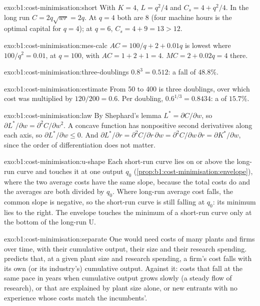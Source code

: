 \begin{solution}{exo:b1:cost-minimisation:short}
With $K = 4$, $L = q^2/4$ and $C_s = 4 + q^2/4$. In the long run $C = 2q\sqrt{wr} = 2q$.
At $q = 4$ both are 8 (four machine hours is the optimal capital for
$q = 4$); at $q = 6$, $C_s = 4 + 9 = 13 > 12$.
\end{solution}

\begin{solution}{exo:b1:cost-minimisation:mes-calc}
$AC = 100/q + 2 + 0.01q$ is lowest where $100/q^2 = 0.01$, at $q = 100$, with
$AC = 1 + 2 + 1 = 4$. $MC = 2 + 0.02q = 4$ there.
\end{solution}

\begin{solution}{exo:b1:cost-minimisation:three-doublings}
$0.8^3 = 0.512$: a fall of $48.8\%$.
\end{solution}

\begin{solution}{exo:b1:cost-minimisation:estimate}
From 50 to 400 is three doublings, over which cost was multiplied by
$120/200 = 0.6$. Per doubling, $0.6^{1/3} = 0.8434$: a  of $15.7\%$.
\end{solution}

\begin{solution}{exo:b1:cost-minimisation:law}
By Shephard's lemma $L^* = \partial C/\partial w$, so
$\partial L^*/\partial w = \partial^2C/\partial w^2$. A concave function has nonpositive second
derivatives along each axis, so $\partial L^*/\partial w \le 0$. And
$\partial L^*/\partial r = \partial^2C/\partial r\,\partial w = \partial^2C/\partial w\,\partial r = \partial K^*/\partial w$,
since the order of differentiation does not matter.
\end{solution}

\begin{solution}{exo:b1:cost-minimisation:u-shape}
Each short-run curve lies on or above the long-run curve and touches it at
one output $q_0$ (\cref{prop:b1:cost-minimisation:envelope}), where the two
average costs have the same slope, because the total costs do and the
averages are both divided by $q_0$. Where long-run average cost falls, the
common slope is negative, so the short-run curve is still falling at $q_0$:
its minimum lies to the right. The envelope touches the minimum of a
short-run curve only at the bottom of the long-run U.
\end{solution}

\begin{solution}{exo:b1:cost-minimisation:separate}
One would need costs of many plants and firms over time, with their
cumulative output, their size and their research spending.  predicts that, at a given plant size and research spending, a firm's
cost falls with its own (or its industry's) cumulative output. Against it:
costs that fall at the same pace in years when cumulative output grows
slowly (a steady flow of research), or that are explained by plant size
alone, or new entrants with no experience whose costs match the
incumbents'.
\end{solution}

